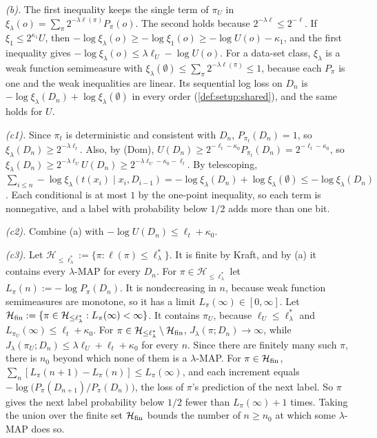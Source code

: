 \emph{(b).} The first inequality keeps the single term of $\pi_U$ in $\xi_\lambda(o)=\sum_\pi2^{-\lambda\ell(\pi)}P_\pi(o)$. The second holds because $2^{-\lambda\ell}\le2^{-\ell}$. If $\xi_1\le2^{\kappa_1}U$, then $-\log\xi_\lambda(o)\ge-\log\xi_1(o)\ge-\log U(o)-\kappa_1$, and the first inequality gives $-\log\xi_\lambda(o)\le\lambda\ell_U-\log U(o)$. For a data-set class, $\xi_\lambda$ is a weak function semimeasure with $\xi_\lambda(\emptyset)\le\sum_\pi2^{-\lambda\ell(\pi)}\le1$, because each $P_\pi$ is one and the weak inequalities are linear. Its sequential log loss on $D_n$ is $-\log\xi_\lambda(D_n)+\log\xi_\lambda(\emptyset)$ in every order (\cref{def:setup:shared}), and the same holds for $U$.

\emph{(c1).} Since $\pi_t$ is deterministic and consistent with $D_n$, $P_{\pi_t}(D_n)=1$, so $\xi_\lambda(D_n)\ge2^{-\lambda\ell_t}$. Also, by (Dom), $U(D_n)\ge2^{-\ell_t-\kappa_0}P_{\pi_t}(D_n)=2^{-\ell_t-\kappa_0}$, so $\xi_\lambda(D_n)\ge2^{-\lambda\ell_U}U(D_n)\ge2^{-\lambda\ell_U-\kappa_0-\ell_t}$. By telescoping, $\sum_{i\le n}-\log\xi_\lambda(t(x_i)\mid x_i,D_{i-1})=-\log\xi_\lambda(D_n)+\log\xi_\lambda(\emptyset)\le-\log\xi_\lambda(D_n)$. Each conditional is at most $1$ by the one-point inequality, so each term is nonnegative, and a label with probability below $1/2$ adds more than one bit.

\emph{(c2).} Combine (a) with $-\log U(D_n)\le\ell_t+\kappa_0$.

\emph{(c3).} Let $\mathcal H_{\le\ell^*_\lambda}:=\{\pi:\ell(\pi)\le\ell^*_\lambda\}$. It is finite by Kraft, and by (a) it contains every $\lambda$-MAP for every $D_n$. For $\pi\in\mathcal H_{\le\ell^*_\lambda}$ let $L_\pi(n):=-\log P_\pi(D_n)$. It is nondecreasing in $n$, because weak function semimeasures are monotone, so it has a limit $L_\pi(\infty)\in[0,\infty]$. Let $\mathcal H_{\rm fin}:=\{\pi\in\mathcal H_{\le\ell^*_\lambda}:L_\pi(\infty)<\infty\}$. It contains $\pi_U$, because $\ell_U\le\ell^*_\lambda$ and $L_{\pi_U}(\infty)\le\ell_t+\kappa_0$. For $\pi\in\mathcal H_{\le\ell^*_\lambda}\setminus\mathcal H_{\rm fin}$, $J_\lambda(\pi;D_n)\to\infty$, while $J_\lambda(\pi_U;D_n)\le\lambda\ell_U+\ell_t+\kappa_0$ for every $n$. Since there are finitely many such $\pi$, there is $n_0$ beyond which none of them is a $\lambda$-MAP. For $\pi\in\mathcal H_{\rm fin}$, $\sum_n[L_\pi(n+1)-L_\pi(n)]\le L_\pi(\infty)$, and each increment equals $-\log\big(P_\pi(D_{n+1})/P_\pi(D_n)\big)$, the loss of $\pi$'s prediction of the next label. So $\pi$ gives the next label probability below $1/2$ fewer than $L_\pi(\infty)+1$ times. Taking the union over the finite set $\mathcal H_{\rm fin}$ bounds the number of $n\ge n_0$ at which some $\lambda$-MAP does so.

